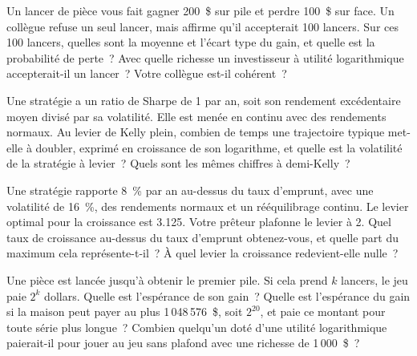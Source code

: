 \begin{question}\label{iq:iv2:betting-and-kelly:21}
Un lancer de pièce vous fait gagner 200~\$ sur pile et perdre 100~\$ sur face. Un collègue refuse un seul lancer, mais affirme qu'il accepterait 100 lancers. Sur ces 100 lancers, quelles sont la moyenne et l'écart type du gain, et quelle est la probabilité de perte~? Avec quelle richesse un investisseur à utilité logarithmique accepterait-il un lancer~? Votre collègue est-il cohérent~?
\end{question}

\begin{question}\label{iq:iv2:betting-and-kelly:22}
Une stratégie a un ratio de Sharpe de 1 par an, soit son rendement excédentaire moyen divisé par sa volatilité. Elle est menée en continu avec des rendements normaux. Au levier de Kelly plein, combien de temps une trajectoire typique met-elle à doubler, exprimé en croissance de son logarithme, et quelle est la volatilité de la stratégie à levier~? Quels sont les mêmes chiffres à demi-Kelly~?
\end{question}

\begin{question}\label{iq:iv2:betting-and-kelly:23}
Une stratégie rapporte 8~\% par an au-dessus du taux d'emprunt, avec une volatilité de 16~\%, des rendements normaux et un rééquilibrage continu. Le levier optimal pour la croissance est 3.125. Votre prêteur plafonne le levier à 2. Quel taux de croissance au-dessus du taux d'emprunt obtenez-vous, et quelle part du maximum cela représente-t-il~? À quel levier la croissance redevient-elle nulle~?
\end{question}

\begin{question}\label{iq:iv2:betting-and-kelly:24}
Une pièce est lancée jusqu'à obtenir le premier pile. Si cela prend $k$ lancers, le jeu paie $2^k$ dollars. Quelle est l'espérance de son gain~? Quelle est l'espérance du gain si la maison peut payer au plus 1\,048\,576~\$, soit $2^{20}$, et paie ce montant pour toute série plus longue~? Combien quelqu'un doté d'une utilité logarithmique paierait-il pour jouer au jeu sans plafond avec une richesse de 1\,000~\$~?
\end{question}

